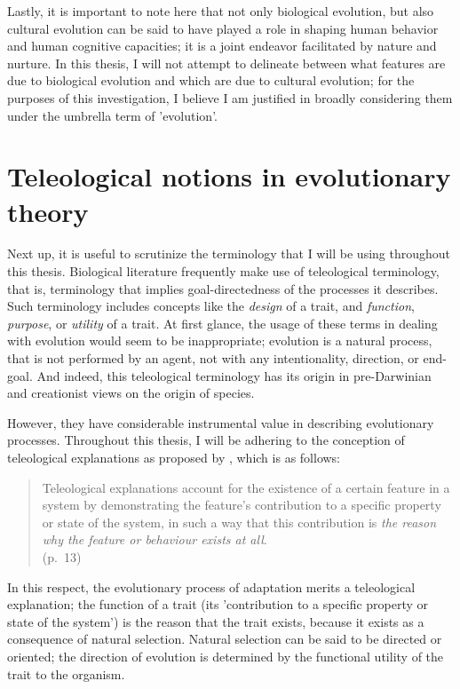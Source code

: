 Lastly, it is important to note here that not only biological evolution, but also cultural evolution can be said to have played a role in shaping human behavior and human cognitive capacities; it is a joint endeavor facilitated by nature and nurture. In this thesis, I will not attempt to delineate between what features are due to biological evolution and which are due to cultural evolution; for the purposes of this investigation, I believe I am justified in broadly considering them under the umbrella term of 'evolution'.

\section{Teleological notions in evolutionary theory}
\label{sec:teleology}

Next up, it is useful to scrutinize the terminology that I will be using throughout this thesis.
Biological literature frequently make use of teleological terminology, that is, terminology that implies goal-directedness of the processes it describes. Such terminology includes concepts like the \emph{design} of a trait, and \emph{function}, \emph{purpose}, or \emph{utility} of a trait.
At first glance, the usage of these terms in dealing with evolution would seem to be inappropriate; evolution is a natural process, that is not performed by an agent, not with any intentionality, direction, or end-goal. And indeed, this teleological terminology has its origin in pre-Darwinian and creationist views on the origin of species.

However, they have considerable instrumental value in describing evolutionary processes. Throughout this thesis, I will be adhering to the conception of teleological explanations as proposed by \citet{Ayala99}, which is as follows:
\begin{quote}
    Teleological explanations account for the existence of a certain feature in a system by demonstrating the feature’s contribution to a specific property or state of the system, in such a way that this contribution is \emph{the reason why the feature or behaviour exists at all}.
    \\ \hfill
    (p.~13)
\end{quote}
In this respect, the evolutionary process of adaptation merits a teleological explanation; the function of a trait (its 'contribution to a specific property or state of the system') is the reason that the trait exists, because it exists as a consequence of natural selection.
Natural selection can be said to be directed or oriented; the direction of evolution is determined by the functional utility of the trait to the organism.

